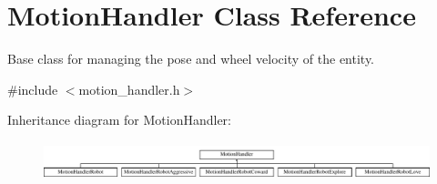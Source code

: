 \hypertarget{class_motion_handler}{}\section{Motion\+Handler Class Reference}
\label{class_motion_handler}


Base class for managing the pose and wheel velocity of the entity.  




{\ttfamily \#include $<$motion\+\_\+handler.\+h$>$}

Inheritance diagram for Motion\+Handler\+:\begin{figure}[H]
\begin{center}
\leavevmode
\includegraphics[height=1.125628cm]{class_motion_handler}
\end{center}
\end{figure}
